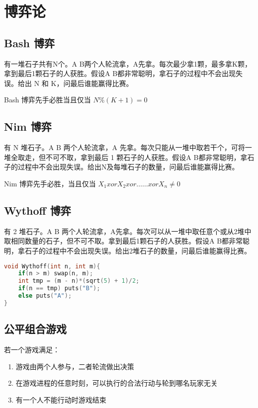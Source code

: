

\section{博弈论}

\subsection{Bash 博弈}

有一堆石子共有N个。A B两个人轮流拿，A先拿。每次最少拿1颗，最多拿K颗，拿到最后1颗石子的人获胜。假设A B都非常聪明，拿石子的过程中不会出现失误。给出 N 和 K，问最后谁能赢得比赛。

Bash 博弈先手必胜当且仅当 $N \% (K + 1) = 0$

\subsection{Nim 博弈}

有 N 堆石子。A B 两个人轮流拿，A 先拿。每次只能从一堆中取若干个，可将一堆全取走，但不可不取，拿到最后 1 颗石子的人获胜。假设A B都非常聪明，拿石子的过程中不会出现失误。给出N及每堆石子的数量，问最后谁能赢得比赛。

Nim 博弈先手必胜，当且仅当 $X_1 xor X_2 xor …… xor X_n \neq 0$

\subsection{Wythoff 博弈}

有 2 堆石子。A B 两个人轮流拿，A先拿。每次可以从一堆中取任意个或从2堆中取相同数量的石子，但不可不取。拿到最后1颗石子的人获胜。假设A B都非常聪明，拿石子的过程中不会出现失误。给出2堆石子的数量，问最后谁能赢得比赛。

\begin{lstlisting}[language=C++]
void Wythoff(int n, int m){
    if(n > m) swap(n, m);
    int tmp = (m - n)*(sqrt(5) + 1)/2;
    if(n == tmp) puts("B");
    else puts("A");
}
\end{lstlisting}

\subsection{公平组合游戏}

若一个游戏满足：

\begin{enumerate}
    \item 游戏由两个人参与，二者轮流做出决策
    \item 在游戏进程的任意时刻，可以执行的合法行动与轮到哪名玩家无关
    \item 有一个人不能行动时游戏结束
\end{enumerate}

